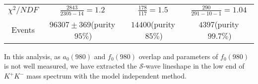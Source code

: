 {\begin{table}[htbp]
\begin{center}
\begin{tabular}{cccc}
                $\chi^{2}/NDF$                                                  & $\frac{2843}{2305-14}=1.2$ & $\frac{178}{117}=1.5$ & $\frac{290}{291-10-1}=1.04$\\
                Events                                                         &$96307\pm369$(purity$\ 95\%$)          &$14400$(purity$\ 85\%$)  &$4397$(purity$\ 99.7\%$)\\
                \bottomrule\bottomrule
            \end{tabular}
        \end{center}
    \end{table}

    In this analysis, as $a_{0}(980)$ and $f_{0}(980)$ overlap and parameters of $f_{0}(980)$ is not well measured, 
    we have extracted the $\mathcal{S}$-wave lineshape in the low end of $K^{+}K^{-}$ mass spectrum with the model independent method.
    
}
